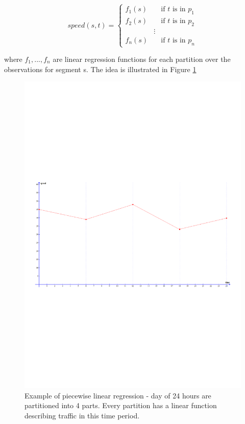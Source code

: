 \begin{equation}\label{eq:speed-piecewise}
speed(s,t) =
\begin{cases}
f_1(s)       & \quad \text{if } t \text{ is in } p_1\\
f_2(s)  & \quad \text{if } t \text{ is in } p_2\\
&\vdots\\
f_n(s) & \quad \text{if } t \text{ is in } p_n
\end{cases}
\end{equation}

where $f_1,...,f_n$ are linear regression functions for each partition over the observations for segment s. The idea is illustrated in Figure \ref{fig:segmented-regression}
\begin{figure}
\centering
\includegraphics[trim={0 9cm 0 9cm},clip, width=\textwidth]{figures/piecewise.pdf}
\caption{Example of piecewise linear regression - day of 24 hours are partitioned into 4 parts. Every partition has a linear function describing traffic in this time period.}
\label{fig:segmented-regression}
\end{figure}
